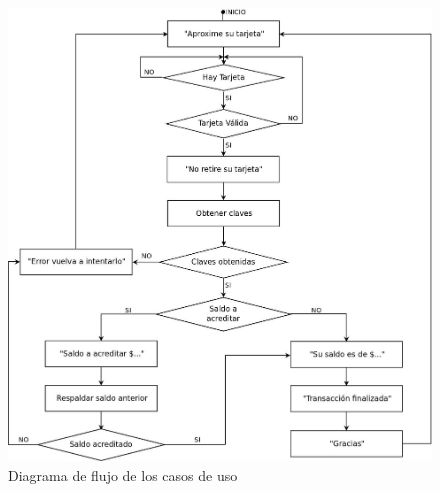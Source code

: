 \newpage
\begin{figure}[H]
\centering
  \begin{center}
   \includegraphics[scale=.35]{Imagenes/flujo.jpg}
  \end{center}
  \caption{Diagrama de flujo de los casos de uso}\label{Fig:DiagFlujo} 
\end{figure}